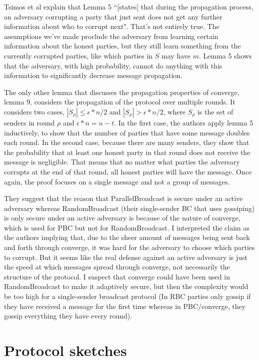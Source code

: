 \documentclass{article}
\begin{document}
Tsimos et al \cite{PBC} explain that Lemma 5 ``[states] that during the propagation process, an adversary corrupting a party that just sent does not get any further information about who to corrupt next". That's not entirely true. The assumptions we've made proclude the adversary from learning certain information about the honest parties, but they still learn something from the currently corrupted parties, like which parties in $S$ may have $m$. Lemma 5 shows that the adversary, with high probability, cannot do anything with this information to significantly decrease message propagation.

The only other lemma that discusses the propagation properties of converge, lemma 9, considers the propagation of the protocol over multiple rounds. It considers two cases, $|S_\rho| \leq \epsilon * n / 2$ and $|S_\rho| > \epsilon * n / 2$, where $S_\rho$ is the set of senders in round $\rho$ and $\epsilon * n = n - t$. In the first case, the authors apply lemma 5 inductively, to show that the number of parties that have some message doubles each round. In the second case, because there are many senders, they show that the probability that at least one honest party in that round does not receive the message is negligible. That means that no matter what parties the adversary corrupts at the end of that round, all honest parties will have the message. Once again, the proof focuses on a single message and not a group of messages. 

They suggest that the reason that ParallelBroadcast is secure under an active adversary whereas RandomBroadcast (their single-sender BC that uses gossiping) is only secure under an active adversary is because of the nature of converge, which is used for PBC but not for RandomBroadcast. I interpreted the claim as the authors implying that, due to the sheer amount of messages being sent back and forth through converge, it was hard for the adversary to choose which parties to corrupt. But it seems like the real defense against an active adversary is just the speed at which messages spread through converge, not necessarily the structure of the protocol. I suspect that converge could have been used in RandomBroadcast to make it adaptively secure, but then the complexity would be too high for a single-sender broadcast protocol (In RBC parties only gossip if they have received a message for the first time whereas in PBC/converge, they gossip everything they have every round).


\section{Protocol sketches}
\end{document}
